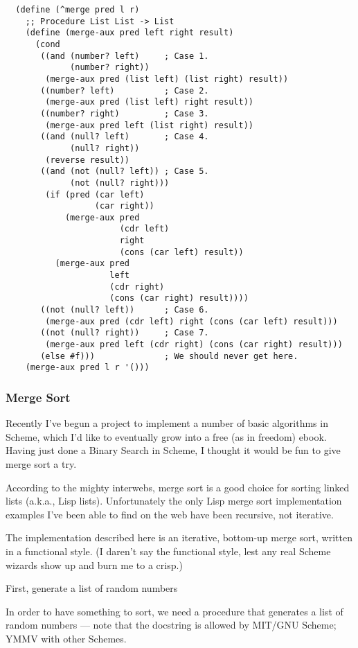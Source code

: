 \documentclass[12pt,openright,draft]{book}
\begin{document}
\begin{verbatim}
  (define (^merge pred l r)
    ;; Procedure List List -> List
    (define (merge-aux pred left right result)
      (cond
       ((and (number? left)     ; Case 1.
             (number? right))
        (merge-aux pred (list left) (list right) result))
       ((number? left)          ; Case 2.
        (merge-aux pred (list left) right result))
       ((number? right)         ; Case 3.
        (merge-aux pred left (list right) result))
       ((and (null? left)       ; Case 4.
             (null? right))
        (reverse result))
       ((and (not (null? left)) ; Case 5.
             (not (null? right)))
        (if (pred (car left)
                  (car right))
            (merge-aux pred
                       (cdr left)
                       right
                       (cons (car left) result))
          (merge-aux pred
                     left
                     (cdr right)
                     (cons (car right) result))))
       ((not (null? left))      ; Case 6.
        (merge-aux pred (cdr left) right (cons (car left) result)))
       ((not (null? right))     ; Case 7.
        (merge-aux pred left (cdr right) (cons (car right) result)))
       (else #f)))              ; We should never get here.
    (merge-aux pred l r '()))
\end{verbatim}

\subsubsection{Merge Sort}

Recently I've begun a project to implement a number of basic
algorithms in Scheme, which I'd like to eventually grow into a free
(as in freedom) ebook. Having just done a Binary Search in Scheme, I
thought it would be fun to give merge sort a try.

According to the mighty interwebs, merge sort is a good choice for
sorting linked lists (a.k.a., Lisp lists). Unfortunately the only Lisp
merge sort implementation examples I've been able to find on the web
have been recursive, not iterative.

The implementation described here is an iterative, bottom-up merge
sort, written in a functional style. (I daren't say the functional
style, lest any real Scheme wizards show up and burn me to a crisp.)

First, generate a list of random numbers

In order to have something to sort, we need a procedure that generates
a list of random numbers --- note that the docstring is allowed by
MIT/GNU Scheme; YMMV with other Schemes.
\end{document}
